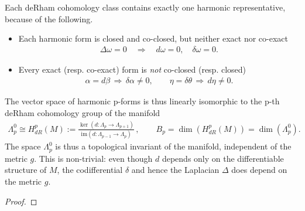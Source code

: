 \begin{mytheorem}
Each deRham cohomology class contains exactly one harmonic representative, because of the following.
\begin{itemize}
    \item Each harmonic form is closed and co-closed, but neither exact nor co-exact
    \begin{align}
        \Delta \omega = 0 \quad \Longrightarrow \quad d\omega = 0, \quad \delta \omega = 0.
    \end{align}
    \item Every exact (resp. co-exact) form is \emph{not} co-closed (resp. closed)
    \begin{align}
        \alpha = d\beta\,\Rightarrow\, \delta \alpha \neq 0, \qquad \eta = \delta \theta\,\Rightarrow\, d\eta \neq 0.
    \end{align}
\end{itemize} 
The vector space of harmonic p-forms is thus linearly isomorphic to the p-th deRham cohomology group of the manifold
\begin{align}
    \Lambda_p^0 \cong H^p_{dR}(M) := \frac{\ker(d:\Lambda_p\to\Lambda_{p+1})}{\mathrm{im}(d:\Lambda_{p-1}\to\Lambda_p)}\,,\qquad B_p=\dim(H^p_{dR}(M)) = \dim(\Lambda_p^0).
\end{align}
The space $\Lambda_p^0$ is thus a topological invariant of the manifold, independent of the metric \(g\).
This is non-trivial: even though $d$ depends only on the differentiable structure of $M$, the codifferential $\delta$ and hence the Laplacian $\Delta$ does depend on the metric $g$.
\end{mytheorem}
\begin{proof}
\end{proof}

